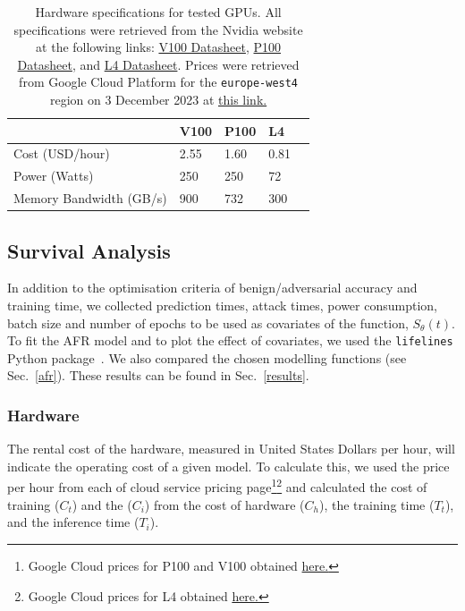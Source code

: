 \documentclass[journal]{IEEEtran}
\begin{document}
\begin{table}[h]
    \centering
    \begin{tabular}{lllll}
    \toprule
                            & V100   & P100   & L4    &  \\
    \midrule
    Cost (USD/hour)         & 2.55   & 1.60   & 0.81   &  \\
    Power (Watts)           & 250    & 250    & 72    &  \\
    Memory Bandwidth (GB/s) & 900    & 732    & 300   &  \\
    \bottomrule
    \end{tabular}
    \caption{Hardware specifications for tested GPUs. All specifications were retrieved from the Nvidia website at the following links: 
    \href{https://images.nvidia.com/content/technologies/volta/pdf/volta-v100-datasheet-update-us-1165301-r5.pdf}{V100 Datasheet},
    \href{https://images.nvidia.com/content/tesla/pdf/nvidia-tesla-p100-PCIe-datasheet.pdf}{P100 Datasheet}, and
    \href{https://nvdam.widen.net/s/rvq98gbwsw/l4-datasheet-2595652}{L4 Datasheet}. Prices were retrieved from Google Cloud Platform for the \texttt{europe-west4} region on 3 December 2023 at \href{https://cloud.google.com/pricing/list}{this link.}
    }
    \label{tab:hardware}
\end{table}

\subsection{Survival Analysis}
In addition to the optimisation criteria of benign/adversarial accuracy and training time, we collected prediction times, attack times, power consumption, batch size and number of epochs to be used as covariates of the function, $S_{\theta}(t)$. To fit the AFR model and to plot the effect of covariates, we used the \texttt{lifelines} Python package~\cite{lifelines}. We also compared the chosen modelling functions (see Sec.~\ref{afr}).  These results can be found in Sec.~\ref{results}.



\subsubsection{Hardware}
The rental cost of the hardware, measured in United States Dollars per hour, will indicate the operating cost of a given model. To calculate this, we used the price per hour from each of cloud service pricing page\footnote{Google Cloud prices for P100 and V100 obtained \href{https://cloud.google.com/compute/gpus-pricing}{here.}}\footnote{Google Cloud prices for L4 obtained  \href{https://cloud.google.com/compute/vm-instance-pricing\#accelerator-optimised}{here.}} and calculated the cost of training ($C_{t}$) and the ($C_{i}$) from the cost of hardware ($C_{h}$), the training time ($T_{t}$), and the inference time ($T_{i}$).
\end{document}
